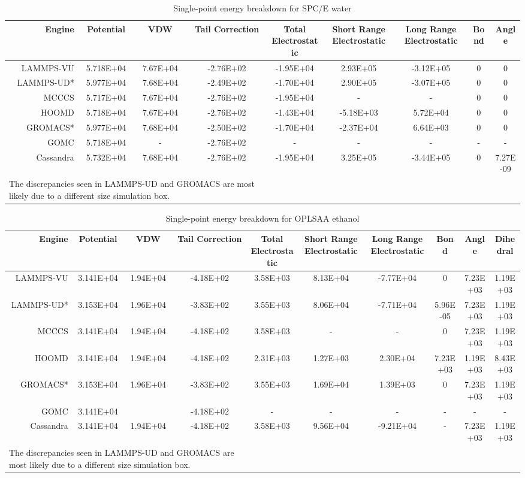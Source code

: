 \begin{table}
\caption{Single-point energy breakdown for SPC/E water}\label{tab:sp_water}
\centering
\begin{tabular}{rcccccccc}
\hline
Engine & Potential & VDW & Tail Correction & Total Electrostatic & Short Range Electrostatic & Long Range Electrostatic & Bond & Angle \\ \hline
LAMMPS-VU & 5.718E+04 & 7.67E+04 & -2.76E+02 & -1.95E+04 & 2.93E+05 & -3.12E+05 & 0 & 0 \\
LAMMPS-UD* & 5.977E+04 & 7.68E+04 & -2.49E+02 & -1.70E+04 & 2.90E+05 & -3.07E+05 & 0 & 0 \\
MCCCS & 5.717E+04 & 7.67E+04 & -2.76E+02 & -1.95E+04 & - & - & 0 & 0 \\
HOOMD & 5.718E+04 & 7.67E+04 & -2.76E+02 & -1.43E+04 & -5.18E+03 & 5.72E+04 & 0 & 0 \\
GROMACS* & 5.977E+04 & 7.68E+04 & -2.50E+02 & -1.70E+04 & -2.37E+04 & 6.64E+03 & 0 & 0 \\
GOMC & 5.718E+04 & - & -2.76E+02 & - & - & - & - & - \\
Cassandra & 5.732E+04 & 7.68E+04 & -2.76E+02 & -1.95E+04 & 3.25E+05 & -3.44E+05 & 0 & 7.27E-09 \\ \hline
\multicolumn{4}{l}{\small *The discrepancies seen in LAMMPS-UD and GROMACS are most likely due to a different size simulation box.} \\
\end{tabular}
\end{table}

\begin{table}
\caption{Single-point energy breakdown for OPLSAA ethanol}\label{tab:sp_ethanol}
\centering
\begin{tabular}{rccccccccc}
Engine & Potential & VDW & Tail Correction & Total Electrostatic & Short Range Electrostatic & Long Range Electrostatic & Bond & Angle & Dihedral \\ \hline
LAMMPS-VU & 3.141E+04 & 1.94E+04 & -4.18E+02 & 3.58E+03 & 8.13E+04 & -7.77E+04 & 0 & 7.23E+03 & 1.19E+03 \\
LAMMPS-UD* & 3.153E+04 & 1.96E+04 & -3.83E+02 & 3.55E+03 & 8.06E+04 & -7.71E+04 & 5.96E-05 & 7.23E+03 & 1.19E+03 \\
MCCCS & 3.141E+04 & 1.94E+04 & -4.18E+02 & 3.58E+03 & - & - & 0 & 7.23E+03 & 1.19E+03 \\
HOOMD & 3.141E+04 & 1.94E+04 & -4.18E+02 & 2.31E+03 & 1.27E+03 & 2.30E+04 & 7.23E+03 & 1.19E+03 & 8.43E+03 \\
GROMACS* & 3.153E+04 & 1.96E+04 & -3.83E+02 & 3.55E+03 & 1.69E+04 & 1.39E+03 & 0 & 7.23E+03 & 1.19E+03 \\
GOMC & 3.141E+04 &  & -4.18E+02 & - & - & - & - & - & - \\
Cassandra & 3.141E+04 & 1.94E+04 & -4.18E+02 & 3.58E+03 & 9.56E+04 & -9.21E+04 & - & 7.23E+03 & 1.19E+03 \\ \hline
\multicolumn{4}{l}{\small *The discrepancies seen in LAMMPS-UD and GROMACS are most likely due to a different size simulation box.}
\end{tabular}
\end{table}

